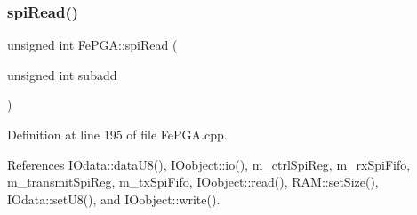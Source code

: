 \mbox{\label{classFePGA_a165f5b70ad30af106ecf9a3ace71d4eb}} 
\subsubsection{\texorpdfstring{spi\+Read()}{spiRead()}\hspace{0.1cm}{\footnotesize\ttfamily [3/3]}}
{\footnotesize\ttfamily unsigned int Fe\+P\+G\+A\+::spi\+Read (\begin{DoxyParamCaption}\item[{unsigned int}]{subadd }\end{DoxyParamCaption})}



Definition at line 195 of file Fe\+P\+G\+A.\+cpp.



References I\+Odata\+::data\+U8(), I\+Oobject\+::io(), m\+\_\+ctrl\+Spi\+Reg, m\+\_\+rx\+Spi\+Fifo, m\+\_\+transmit\+Spi\+Reg, m\+\_\+tx\+Spi\+Fifo, I\+Oobject\+::read(), R\+A\+M\+::set\+Size(), I\+Odata\+::set\+U8(), and I\+Oobject\+::write().


